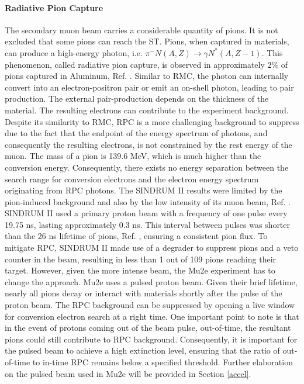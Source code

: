 \paragraph{Radiative Pion Capture}
The secondary muon beam carries a considerable quantity of pions.  It is not excluded 
that some pions can reach the ST. Pions, when captured in materials, can 
produce a high-energy photon, i.e. $\pi^- N(A,Z) \rightarrow \gamma N ^* (A,Z-1)$. 
This phenomenon, called radiative pion capture, is observed in approximately 2\% of 
pions captured in Aluminum, Ref. \cite{PhysRevC.5.1867}. Similar to RMC, the photon 
can internally convert into an electron-positron pair or emit an on-shell photon, 
leading to pair production. The external pair-production depends on the thickness 
of the material. The resulting electrons can contribute to the experiment background. 
Despite its similarity to RMC, RPC is a more challenging background to suppress due to 
the fact that the endpoint of the energy spectrum of photons, and consequently the 
resulting electrons, is not constrained by the rest energy of the muon. The mass of 
a pion is 139.6 MeV, which is much higher than the conversion energy. Consequently, 
there exists no energy separation between the search range for conversion electrons 
and the electron energy spectrum originating from RPC photons. The SINDRUM II results 
were limited by the pion-induced background and also by the low intensity of its muon 
beam, Ref. \cite{SINDRUMII:2006dvw}. SINDRUM II used a primary proton beam with a 
frequency of one pulse every 19.75 ns, lasting approximately 0.3 ns. This interval 
between pulses was shorter than the 26 ns lifetime of pions, Ref. \cite{zyla}, 
ensuring a consistent pion flux. To mitigate RPC, SINDRUM II made use of a degrader to suppress 
pions and a veto counter in the beam, resulting in less than 1 out of 109 pions reaching their 
target. However, given the more intense beam, the Mu2e experiment has to change the approach. 
Mu2e uses a pulsed proton beam. Given their brief lifetime, nearly all pions decay or 
interact with materials shortly after the pulse of the proton beam. The RPC background 
can be suppressed by opening a live window for conversion electron search at a right time. 
One important point to note is that in the event of protons coming out of the beam pulse, 
out-of-time, the resultant pions could still contribute to RPC background. Consequently, 
it is important for the pulsed beam to achieve a high extinction level, ensuring that the 
ratio of out-of-time to in-time RPC remains below a specified threshold. Further elaboration 
on the pulsed beam used in Mu2e will be provided in Section \ref{accel}.
